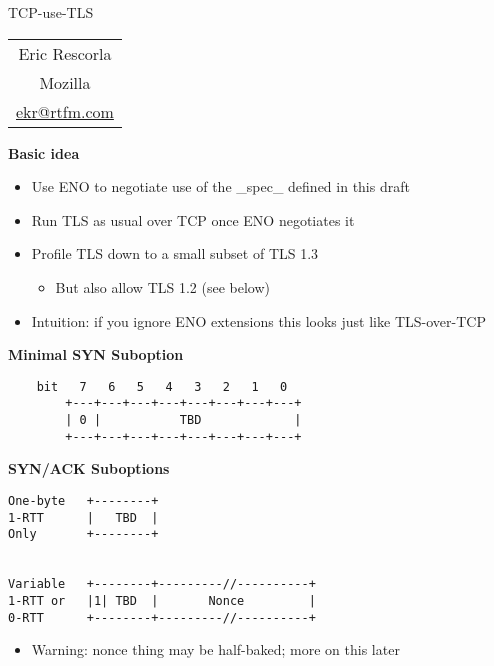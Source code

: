 \documentclass[helvetica]{seminar}
\newcommand{\heading}[1]{%
  \begin{center} 
    \large\bf 
    #1 
  \end{center} 
  \vspace{.4 in}}
\begin{document}
\begin{slide}
\begin{center}
\vspace{.5 in}
\LARGE{{\bf}TCP-use-TLS}\\
\vspace{.2in}
\large{
\begin{tabular}{c}
Eric Rescorla\\
Mozilla\\
\url{ekr@rtfm.com}
\end{tabular}
}
\end{center}

\end{slide}
\centerslidesfalse 

\begin{slide}
\heading{Basic idea}

\begin{itemize}
\item Use ENO to negotiate use of the \_spec\_ defined in this draft
\item Run TLS as usual over TCP once ENO negotiates it
\item Profile TLS down to a small subset of TLS 1.3
  \begin{itemize}
  \item But also allow TLS 1.2 (see below)
  \end{itemize}
\item Intuition: if you ignore ENO extensions this looks just like TLS-over-TCP
\end{itemize}

\end{slide}


\begin{slide}
\heading{Minimal SYN Suboption}

\begin{verbatim}
    bit   7   6   5   4   3   2   1   0
        +---+---+---+---+---+---+---+---+
        | 0 |           TBD             |
        +---+---+---+---+---+---+---+---+
\end{verbatim}
\end{slide}

\begin{slide}
\heading{SYN/ACK Suboptions}

\begin{verbatim}
One-byte   +--------+
1-RTT      |   TBD  |
Only       +--------+  


Variable   +--------+---------//----------+
1-RTT or   |1| TBD  |       Nonce         |
0-RTT      +--------+---------//----------+
\end{verbatim}

\begin{itemize}
\item Warning: nonce thing may be half-baked; more on this later
\end{itemize}
\end{slide}
\end{document}
